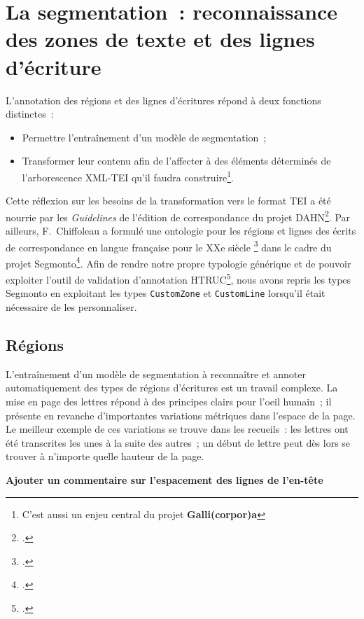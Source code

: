 \documentclass[a4paper,12pt,twoside]{book}
\begin{document}
		\section[La segmentation]{La segmentation~: reconnaissance des zones de texte et des lignes d'écriture}
			L'annotation des régions et des lignes d'écritures répond à deux fonctions distinctes~:
			
			\begin{itemize}
				\item Permettre l'entraînement d'un modèle de segmentation~;
				\item Transformer leur contenu afin de l'affecter à des éléments déterminés de l'arborescence XML-TEI qu'il faudra construire\footnote{C'est aussi un enjeu central du projet \textbf{Galli(corpor)a}}.
			\end{itemize}

				Cette réflexion sur les besoins de la transformation vers le format TEI a été nourrie par les \textit{Guidelines} de l'édition de correspondance du projet DAHN\footcite{chiffoleauCorrespondenceGuidelines2022}. Par ailleurs, F.~Chiffoleau a formulé une ontologie pour les régions et lignes des écrits de correspondance en langue française pour le XXe siècle \footcite{chiffoleauCorrespondanceLangueFrancaise2021} dans le cadre du projet \gls{Segmonto}\footcite{gabaySegmOntoCommonVocabulary2021}. Afin de rendre notre propre typologie générique et de pouvoir exploiter l'outil de validation d'annotation HTRUC\footcite{clericeHTRUCHTRUnitedCatalog2021}, nous avons repris les types \gls{Segmonto} en exploitant les types \texttt{CustomZone} et \texttt{CustomLine} lorsqu'il était nécessaire de les personnaliser.

			\subsection{Régions}
				L'entraînement d'un modèle de segmentation à reconnaître et annoter automatiquement des types de régions d'écritures est un travail complexe. La mise en page des lettres répond à des principes clairs pour l'oeil humain~; il présente en revanche d'importantes variations métriques dans l'espace de la page. Le meilleur exemple de ces variations se trouve dans les recueils~: les lettres ont été transcrites les unes à la suite des autres~; un début de lettre peut dès lors se trouver à n'importe quelle hauteur de la page. 
				
				\textbf{Ajouter un commentaire sur l'espacement des lignes de l'en-tête}
				
\end{document}
